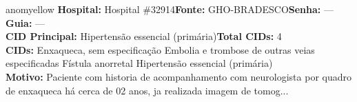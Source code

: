 \documentclass[a4paper,10pt]{article}
\begin{document}
\begin{anomalycard}[Interna\c{c}\~{a}o \#118903 | Pac. \#98622 | MODERADO (z=2.18) | LOS: 2d | 25/02/2026\,$\to$\,27/02/2026]{anomyellow}
\textbf{Hospital:} Hospital \#32914\quad \textbf{Fonte:} GHO-BRADESCO\quad \textbf{Senha:} ---\quad \textbf{Guia:} ---\\

\textbf{CID Principal:} {\small Hipertensão essencial (primária)}\quad\textbf{Total CIDs:} 4\\

\textbf{CIDs:} {\scriptsize Enxaqueca, sem especificação \textbar{} Embolia e trombose de outras veias especificadas \textbar{} Fístula anorretal \textbar{} Hipertensão essencial (primária)}\\

\textbf{Motivo:} {\scriptsize Paciente com historia de acompanhamento com neurologista por quadro de enxaqueca há cerca de 02 anos, ja realizada imagem de tomog...}\\




\end{anomalycard}
\end{document}
